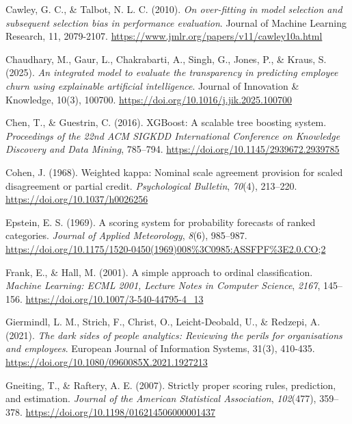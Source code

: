 \documentclass[
  a4paper,
  review]{elsarticle}
\newlength{\cslhangindent}
\newenvironment{CSLReferences}[2] %
 {\begin{list}{}{%
  \setlength{\itemindent}{0pt}
  \setlength{\leftmargin}{0pt}
  \setlength{\parsep}{0pt}
  \ifodd #1
   \setlength{\leftmargin}{\cslhangindent}
   \setlength{\itemindent}{-1\cslhangindent}
  \fi
  \setlength{\itemsep}{#2\baselineskip}}}
 {\end{list}}
\begin{document}
\begin{CSLReferences}{1}{0}
Cawley, G. C., \& Talbot, N. L. C. (2010). \emph{On over-fitting in
model selection and subsequent selection bias in performance
evaluation}. Journal of Machine Learning Research, 11, 2079-2107.
\url{https://www.jmlr.org/papers/v11/cawley10a.html}

Chaudhary, M., Gaur, L., Chakrabarti, A., Singh, G., Jones, P., \&
Kraus, S. (2025). \emph{An integrated model to evaluate the transparency
in predicting employee churn using explainable artificial intelligence}.
Journal of Innovation \& Knowledge, 10(3), 100700.
\url{https://doi.org/10.1016/j.jik.2025.100700}

Chen, T., \& Guestrin, C. (2016). {XGBoost}: A scalable tree boosting
system. \emph{Proceedings of the 22nd ACM SIGKDD International
Conference on Knowledge Discovery and Data Mining}, 785--794.
\url{https://doi.org/10.1145/2939672.2939785}

Cohen, J. (1968). Weighted kappa: Nominal scale agreement provision for
scaled disagreement or partial credit. \emph{Psychological Bulletin},
\emph{70}(4), 213--220. \url{https://doi.org/10.1037/h0026256}

Epstein, E. S. (1969). A scoring system for probability forecasts of
ranked categories. \emph{Journal of Applied Meteorology}, \emph{8}(6),
985--987.
\url{https://doi.org/10.1175/1520-0450(1969)008\%3C0985:ASSFPF\%3E2.0.CO;2}

Frank, E., \& Hall, M. (2001). A simple approach to ordinal
classification. \emph{Machine Learning: ECML 2001, Lecture Notes in
Computer Science}, \emph{2167}, 145--156.
\url{https://doi.org/10.1007/3-540-44795-4_13}

Giermindl, L. M., Strich, F., Christ, O., Leicht-Deobald, U., \&
Redzepi, A. (2021). \emph{The dark sides of people analytics: Reviewing
the perils for organisations and employees}. European Journal of
Information Systems, 31(3), 410-435.
\url{https://doi.org/10.1080/0960085X.2021.1927213}

Gneiting, T., \& Raftery, A. E. (2007). Strictly proper scoring rules,
prediction, and estimation. \emph{Journal of the American Statistical
Association}, \emph{102}(477), 359--378.
\url{https://doi.org/10.1198/016214506000001437}


\end{CSLReferences}
\end{document}
